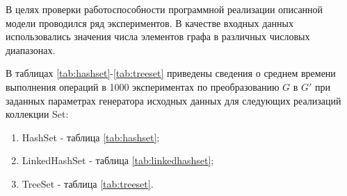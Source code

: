 

В целях проверки работоспособности программной реализации описанной модели проводился ряд экспериментов. В качестве входных данных использовались значения числа элементов графа в различных числовых диапазонах.

В таблицах \ref{tab:hashset}-\ref{tab:treeset} приведены сведения о среднем времени выполнения операций в 1000 экспериментах по преобразованию $G$ в $G'$ при заданных параметрах генератора исходных данных для следующих реализаций коллекции Set:
\begin{enumerate}
    \item HashSet - таблица \ref{tab:hashset};
    \item LinkedHashSet - таблица \ref{tab:linkedhashset};
    \item TreeSet - таблица \ref{tab:treeset}.
\end{enumerate}

